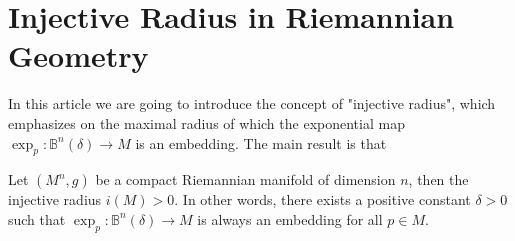 \chapter{Injective Radius in Riemannian Geometry}
In this article we are going to introduce the concept of "injective radius", which emphasizes on the maximal radius of which the exponential map $\exp_p\colon\mathbb{B}^n (\delta )\to M$ is an embedding. The main result is that
\begin{thr}\label{injective-radius-on-compact-manifolds}
    Let $(M^n ,g)$ be a compact Riemannian manifold of dimension $n$, then the injective radius $i(M)>0$. In other words, there exists a positive constant $\delta >0$ such that $\exp_p\colon\mathbb{B}^n (\delta )\to M$ is always an embedding for all $p\in M$.
\end{thr}